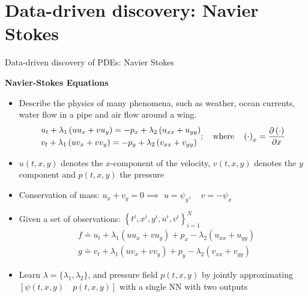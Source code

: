 \documentclass[xcolor=dvipsnames,10pt]{beamer}
\begin{document}
\section{Data-driven discovery: Navier Stokes}
\begin{frame}[t]{Data-driven discovery of PDEs: Navier Stokes}
  
  {\bf Navier-Stokes Equations}
  \begin{itemize}
    \item<2-> Describe the physics of many phenomena, such as weather, ocean currents, water flow in a pipe and air flow around a wing.
    $$
      \begin{aligned}
      &u_{t}+\lambda_{1}\left(u u_{x}+v u_{y}\right)=-p_{x}+\lambda_{2}\left(u_{x x}+u_{y y}\right) \\
      &v_{t}+\lambda_{1}\left(u v_{x}+v v_{y}\right)=-p_{y}+\lambda_{2}\left(v_{x x}+v_{y y}\right)
      \end{aligned};\quad \text{where}\quad \left(\cdot\right)_x = \frac{\partial\left(\cdot\right)}{\partial x}
    $$
    \item<3-> $u(t, x, y)$ denotes the $x$-component of the velocity, $v(t, x, y)$ denotes the $y$ component and $p(t, x, y)$ the pressure
    \item<4-> Conservation of mass: $u_{x}+v_{y}=0 \implies$ $u=\psi_{y}, \quad v=-\psi_{x}$
    \item<5-> Given a set of observations: $\left\{t^{i}, x^{i}, y^{i}, u^{i}, v^{i}\right\}_{i=1}^{N}$
    $$
      \begin{aligned}
      &f \doteq u_{t}+\lambda_{1}\left(u u_{x}+v u_{y}\right)+p_{x}-\lambda_{2}\left(u_{x x}+u_{y y}\right) \\
      &g \doteq v_{t}+\lambda_{1}\left(u v_{x}+v v_{y}\right)+p_{y}-\lambda_{2}\left(v_{x x}+v_{y y}\right)
      \end{aligned}
    $$
    \item<6-> Learn $\lambda = \{\lambda_1, \lambda_2\}$, and pressure field $p(t, x, y)$ by jointly approximating $[\psi(t, x, y) \quad p(t, x, y)]$ with a single NN with two outputs 
  \end{itemize}
\end{frame}
\end{document}
